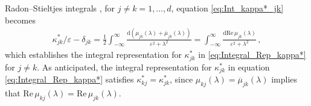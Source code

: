 \documentclass[11pt]{amsart}
\renewcommand{\d}{\mathrm{d}}
\newcommand{\Ab}{\mathbf{A}}
\begin{document}
Radon--Stieltjes integrals \cite{Stone:64}, for $j\neq k=1,\ldots,d$, equation
\eqref{eq:Int_kappa*_jk} becomes 
% 
\begin{align}\label{eq:Int_kappa*_jk_Re}
  \kappa^*_{jk}/\varepsilon-\delta_{jk}
       =\frac{1}{2}\int_{-\infty}^\infty\frac{\d(\mu_{jk}(\lambda)+\overline{\mu}_{jk}(\lambda))}{\varepsilon^2+\lambda^2}
       =\int_{-\infty}^\infty\frac{\d\text{Re}\,\mu_{jk}(\lambda)}{\varepsilon^2+\lambda^2}\,,            
\end{align}
%
which establishes the integral representation for $\kappa^*_{jk}$ in
\eqref{eq:Integral_Rep_kappa*} for $j\neq k$. As anticipated, the
integral representation for $\kappa^*_{jk}$ in equation
\eqref{eq:Integral_Rep_kappa*} satisfies $\kappa^*_{kj}=\kappa^*_{jk}$, since
$\mu_{kj}(\lambda)=\overline{\mu}_{jk}(\lambda)$ implies that
$\text{Re}\,\mu_{kj}(\lambda)=\text{Re}\,\mu_{jk}(\lambda)$.
\end{document}
